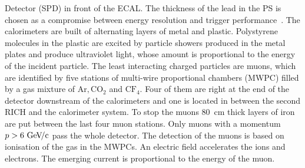 Detector (SPD) in front of the ECAL. The thickness of the lead in the PS is
chosen as a compromise between energy resolution and trigger
performance~\cite{Preshower}. The calorimeters are built of alternating layers
of metal and plastic. Polystyrene molecules in the plastic are excited by
particle showers produced in the metal plates and produce ultraviolet light,
whose amount is proportional to the energy of the incident particle. The least
interacting charged particles are muons, which are identified by five stations
of multi-wire proportional chambers (MWPC) filled by a gas mixture of $\mathrm{Ar,
CO_2}$ and $\mathrm{CF_4}$. Four of them are right at the end of the detector
downstream of the calorimeters and one is located in between the second RICH
and the calorimeter system. To stop the muons \SI{80}{cm} thick layers of iron
are put between the last four muon stations. Only muons with a momentum $p >
\SI{6}{\ensuremath{{\mathrm{\,Ge\kern -0.1em V\!/}c}}}$ pass the whole detector. The detection of the muons is based on
ionisation of the gas in the MWPCs. An electric field accelerates the ions and
electrons. The emerging current is proportional to the energy of the muon.

